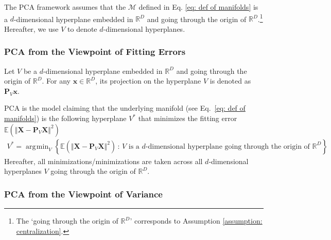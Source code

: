 \documentclass[11pt,letterpaper, leqno]{article}
\DeclareMathOperator*{\argmin}{\arg\!\min}
\numberwithin{equation}{section}
\numberwithin{theorem}{section}
\numberwithin{lemma}{section}
\numberwithin{corollary}{section}
\numberwithin{definition}{section}
\numberwithin{proposition}{section}
\numberwithin{remark}{section}
\numberwithin{example}{section}
\begin{document}
The PCA framework assumes that the $\mathcal{M}$ defined in Eq. \eqref{eq: def of manifolds} is a $d$-dimensional hyperplane embedded in $\mathbb{R}^D$ and going through the origin of $\mathbb{R}^D$.\footnote{The `going through the origin of $\mathbb{R}^D$' corresponds to Assumption \ref{assumption: centralization}.} Hereafter, we use $V$ to denote $d$-dimensional hyperplanes.

\subsubsection{PCA from the Viewpoint of Fitting Errors}

Let $V$ be a $d$-dimensional hyperplane embedded in $\mathbb{R}^D$ and going through the origin of $\mathbb{R}^D$. For any $\boldsymbol{x}\in\mathbb{R}^D$, its projection on the hyperplane $V$ is denoted as $\boldsymbol{P}_V\boldsymbol{x}$.

PCA is the model claiming that the underlying manifold (see Eq.~\eqref{eq: def of manifolds}) is the following hyperplane $V^*$ that minimizes the fitting error $\mathbb{E}\left(\Vert \boldsymbol{X} - \boldsymbol{P}_V \boldsymbol{X} \Vert^2\right)$
\begin{align}
    V^* = \argmin_{V} \left\{ \mathbb{E}\left(\Vert \boldsymbol{X} - \boldsymbol{P}_V \boldsymbol{X} \Vert^2\right) \,:\, V \text{ is a $d$-dimensional hyperplane going through the origin of $\mathbb{R}^D$}\right\}.
\end{align}
Hereafter, all minimizations/minimizations are taken across all $d$-dimensional hyperplanes $V$ going through the origin of $\mathbb{R}^D$.

\subsubsection{PCA from the Viewpoint of Variance}
\end{document}
